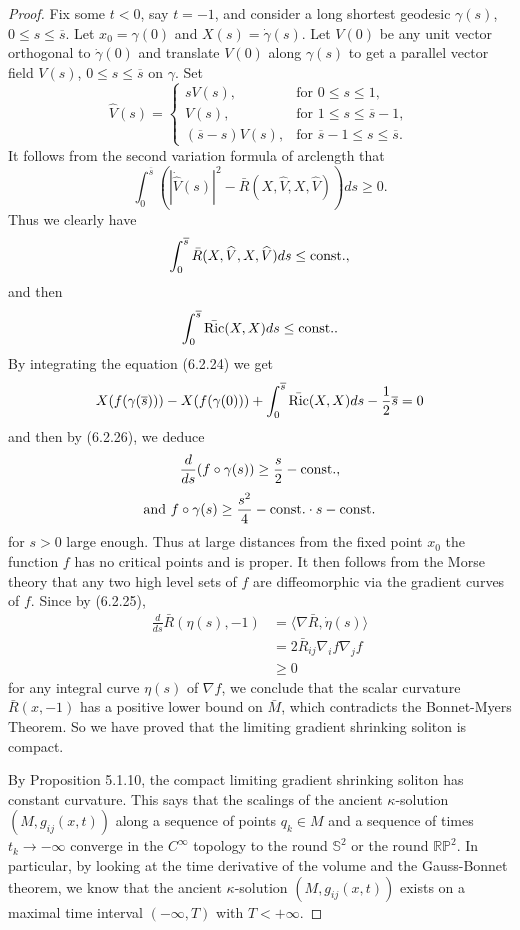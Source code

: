 \begin{proof}
Fix some $t<0$, say $t=-1$, and consider a long shortest geodesic
$\gamma(s)$, $0\leq s\leq \overline{s}$. Let $x_0=\gamma(0)$ and
$X(s)=\dot{\gamma}(s)$. Let $V(0)$ be any unit vector orthogonal
to $\dot{\gamma}(0)$ and translate $V(0)$ along $\gamma(s)$ to get
a parallel vector field $V(s)$, $0\leq s\leq \overline{s}$ on
$\gamma$. Set
$$
\widehat{V}(s)=
\begin{cases}
sV(s), & \mbox{for  $0\leq s\leq 1$},\\
V(s), & \mbox{for  $1\leq s\leq \overline{s}-1$},\\
(\overline{s}-s)V(s), & \mbox{for  $\overline{s}-1\leq s\leq
\overline{s}.$}
\end{cases}
$$
It follows from the second variation formula of arclength that
$$
\int^{\overline{s}}_0(|\dot{\widehat{V}}(s)|^2
-\bar{R}(X,\widehat{V},X,\widehat{V}))ds\geq 0.
$$
Thus we clearly have
$$
\int^{\overline{s}}_0\bar{R}(X,\widehat{V},X,\widehat{V})ds\leq
{\rm const.},
$$
and then \begin{equation} \int^{\overline{s}}_0\bar{\rm Ric}(X,X)ds\leq
{\rm const.} . %
\end{equation} By integrating the equation (6.2.24) we get
$$
X(f(\gamma(\overline{s})))-X(f(\gamma(0)))
+\int^{\overline{s}}_0\bar{\rm
Ric}(X,X)ds-\frac{1}{2}\overline{s}=0
$$
and then by (6.2.26), we deduce
$$
\frac{d}{ds}(f\circ\gamma(s))\geq \frac{s}{2}-{\rm const.},
$$
$$
\mbox{and } f\circ\gamma(s)\geq \frac{s^2}{4}-{\rm const.}\cdot
s-{\rm const.}
$$
for $s>0$ large enough. Thus at large distances from the fixed
point $x_0$ the function $f$ has no critical points and is proper.
It then follows from the Morse theory that any two high level sets
of $f$ are diffeomorphic via the gradient curves of $f$. Since by
(6.2.25),
\begin{align*}
\frac{d}{ds}\bar{R}(\eta(s),-1)&  = \langle\nabla \bar{R},\dot{\eta}(s)\rangle\\
&  = 2\bar{R}_{ij}\nabla_if\nabla_jf \\
&  \geq 0
\end{align*}
for any integral curve $\eta(s)$ of $\nabla f$, we conclude that
the scalar curvature $\bar{R}(x,-1)$ has a positive lower bound on
$\bar{M}$, which contradicts the Bonnet-Myers Theorem. So we have
proved that the limiting gradient shrinking soliton is compact.

By Proposition 5.1.10, the compact limiting gradient shrinking
soliton has constant curvature. This says that the scalings of the
ancient $\kappa$-solution $(M,g_{ij}(x,t))$ along a sequence of
points $q_k \in M$ and a sequence of times $t_k \rightarrow
-\infty$ converge in the $C^{\infty}$ topology to the round
$\mathbb{S}^2$ or the round $\mathbb{R}\mathbb{P}^2$. In
particular, by looking at the time derivative of the volume and
the Gauss-Bonnet theorem, we know that the ancient
$\kappa$-solution $(M,g_{ij}(x,t))$ exists on a maximal time
interval $(-\infty,T)$ with $T < +\infty$.


\end{proof}
